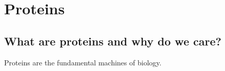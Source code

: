 \chapter{Proteins}
\section{What are proteins and why do we care?}
Proteins are the fundamental machines of biology.

